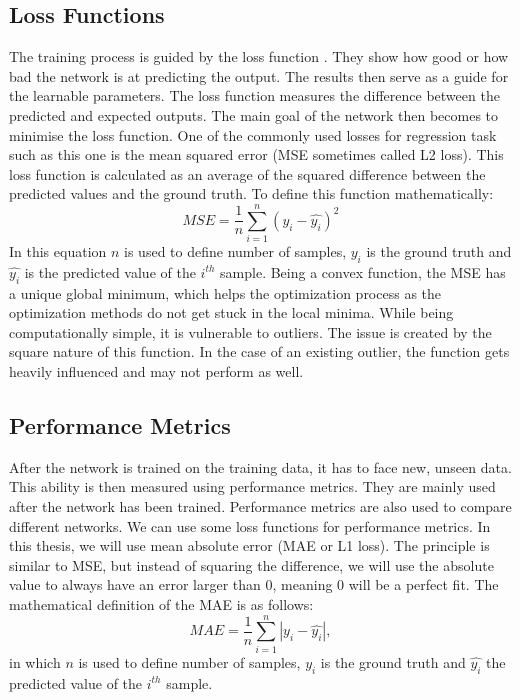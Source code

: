 \subsection{Loss Functions}
The training process is guided by the loss function \cite{loss}. They show how good or how bad the network is at predicting the output. The results then serve as a guide for the learnable parameters. The loss function measures the difference between the predicted and expected outputs. The main goal of the network then becomes to minimise the loss function. One of the commonly used losses for regression task such as this one is the mean squared error (MSE sometimes called L2 loss). This loss function is calculated as an average of the squared difference between the predicted values and the ground truth. To define this function mathematically:
\begin{equation}
	MSE = \frac{1}{n}\sum_{i=1}^{n}(y_i -  \hat{y_i})^2
\end{equation}
In this equation $n$ is used to define number of samples, $y_i$ is the ground truth and $\hat{y_i}$ is the predicted value of the $i^{th}$ sample. Being a convex function, the MSE has a unique global minimum, which helps the optimization process as the optimization methods do not get stuck in the local minima. While being computationally simple, it is vulnerable to outliers. The issue is created by the square nature of this function. In the case of an existing outlier, the function gets heavily influenced and may not perform as well.
\\
\subsection{Performance Metrics}
After the network is trained on the training data, it has to face new, unseen data. This ability is then measured using performance metrics. They are mainly used after the network has been trained. Performance metrics are also used to compare different networks. We can use some loss functions for performance metrics. In this thesis, we will use mean absolute error (MAE or L1 loss). The principle is similar to MSE, but instead of squaring the difference, we will use the absolute value to always have an error larger than 0, meaning 0 will be a perfect fit. The mathematical definition of the MAE is as follows:
\begin{equation}
	MAE = \frac{1}{n}\sum_{i=1}^{n}|y_i -  \hat{y_i}|,
\end{equation}
in which $n$ is used to define number of samples, $y_i$ is the ground truth and $\hat{y_i}$ the predicted value of the $i^{th}$ sample.

